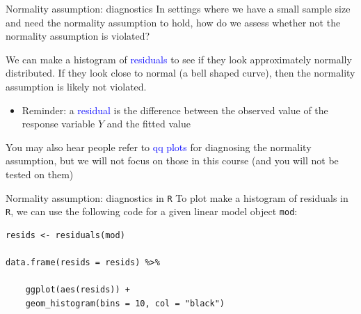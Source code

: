 \documentclass[10pt,t]{beamer}
\begin{document}
\begin{frame}{Normality assumption: diagnostics}
In settings where we have a small sample size and need the normality assumption to hold, how do we assess whether not the normality assumption is violated?

\vspace{0.3cm}

We can make a histogram of \textcolor{blue}{residuals} to see if they look approximately normally distributed. If they look close to normal (a bell shaped curve), then the normality assumption is likely not violated.

\vspace{0.3cm}

\begin{itemize}
	\item[] Reminder: a \textcolor{blue}{residual} is the difference between the observed value of the response variable $Y$ and the fitted value 
\end{itemize}

\vspace{0.3cm}

\small You may also hear people refer to \textcolor{blue}{qq plots} for diagnosing the normality assumption, but we will not focus on those in this course (and you will not be tested on them)

\end{frame}

\begin{frame}[fragile]{Normality assumption: diagnostics in \texttt{R}}
To plot make a histogram of residuals in \texttt{R}, we can use the following code for a given linear model object \texttt{mod}:

\vspace{0.3cm}

\begin{lstlisting}
resids <- residuals(mod)

data.frame(resids = resids) %>%

    ggplot(aes(resids)) +
    geom_histogram(bins = 10, col = "black")
\end{lstlisting}

\end{frame}
\end{document}
